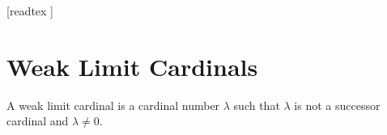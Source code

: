 \documentclass[10pt]{article}
\begin{document}
  \begin{imports}
    \begin{forthel}
      [readtex ]
    \end{forthel}
  \end{imports}


  \section*{Weak Limit Cardinals}

  \begin{forthel}
    \begin{definition}
      A weak limit cardinal is a cardinal number $\lambda$ such that $\lambda$ is not a successor cardinal and $\lambda \neq 0$.
    \end{definition}
  \end{forthel}
\end{document}
